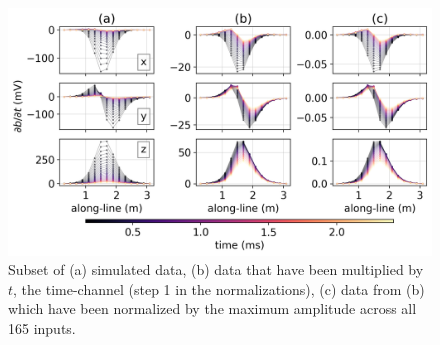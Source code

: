 \begin{figure}[htb]
    \vspace{-0.1cm}
    \begin{center}
    \includegraphics[width=\columnwidth]{figures/data_normalizations.png}
    \end{center}
    \vspace{-0.5cm}
\caption{
    Subset of (a) simulated data,
    (b) data that have been multiplied by $t$, the time-channel (step 1 in the normalizations),
    (c) data from (b) which have been normalized by the maximum amplitude across all 165 inputs.
}
\label{fig:data-normalizations}
\vspace{-0.1cm}
\end{figure}

